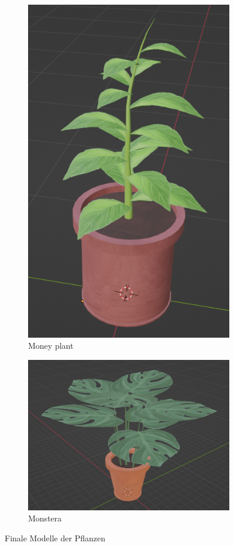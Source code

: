 \begin{figure}[H]
	\begin{subfigure}{0.5\textwidth}
		\centering
		\includegraphics[height=0.3\pageheight,keepaspectratio]{pics/11} 
		\caption{Money plant}
	\end{subfigure}	
	\begin{subfigure}{0.5\textwidth}
		\centering
		\includegraphics[height=0.3\pageheight,keepaspectratio]{pics/12} 
		\caption{Monstera}
	\end{subfigure}	
	\caption{Finale Modelle der Pflanzen}
\end{figure}
